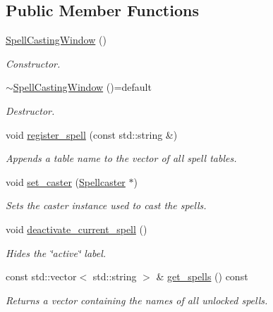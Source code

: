 \subsection*{Public Member Functions}
\begin{DoxyCompactItemize}
\item 
\hyperlink{class_spell_casting_window_aedd56bc34ff05cfdb6e068f17e23af6d}{Spell\+Casting\+Window} ()
\begin{DoxyCompactList}\small\item\em Constructor. \end{DoxyCompactList}\item 
\hyperlink{class_spell_casting_window_ad51f4c404269beb9959d66c5d5533791}{$\sim$\+Spell\+Casting\+Window} ()=default
\begin{DoxyCompactList}\small\item\em Destructor. \end{DoxyCompactList}\item 
void \hyperlink{class_spell_casting_window_a4c5bec658b7a9eb5f09e7de65c5841b5}{register\+\_\+spell} (const std\+::string \&)
\begin{DoxyCompactList}\small\item\em Appends a table name to the vector of all spell tables. \end{DoxyCompactList}\item 
void \hyperlink{class_spell_casting_window_a4168b2d0122273ba7f46a01dd5f37771}{set\+\_\+caster} (\hyperlink{class_spellcaster}{Spellcaster} $\ast$)
\begin{DoxyCompactList}\small\item\em Sets the caster instance used to cast the spells. \end{DoxyCompactList}\item 
void \hyperlink{class_spell_casting_window_a69be5be89e7db88045e4f2101e99c723}{deactivate\+\_\+current\+\_\+spell} ()
\begin{DoxyCompactList}\small\item\em Hides the \char`\"{}active\char`\"{} label. \end{DoxyCompactList}\item 
const std\+::vector$<$ std\+::string $>$ \& \hyperlink{class_spell_casting_window_a7c04e7d5264ad57bf457a7af90fe2751}{get\+\_\+spells} () const 
\begin{DoxyCompactList}\small\item\em Returns a vector containing the names of all unlocked spells. \end{DoxyCompactList}\item 

\end{DoxyCompactItemize}
